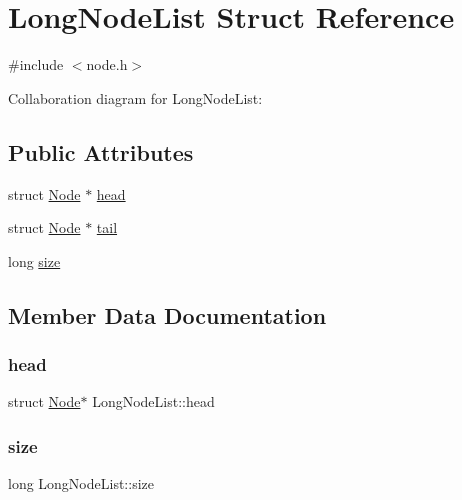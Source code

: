 \hypertarget{structLongNodeList}{}\section{Long\+Node\+List Struct Reference}
\label{structLongNodeList}


{\ttfamily \#include $<$node.\+h$>$}



Collaboration diagram for Long\+Node\+List\+:
\subsection*{Public Attributes}
\begin{DoxyCompactItemize}
\item 
struct \hyperlink{structNode}{Node} $\ast$ \hyperlink{structLongNodeList_a31ec5934364e5823abb697fe8678c03f}{head}
\item 
struct \hyperlink{structNode}{Node} $\ast$ \hyperlink{structLongNodeList_ad3e14e3494a357a5973eeae262c932b9}{tail}
\item 
long \hyperlink{structLongNodeList_a3d46bdf32e624d0b803a851d85695536}{size}
\end{DoxyCompactItemize}


\subsection{Member Data Documentation}
\mbox{\label{structLongNodeList_a31ec5934364e5823abb697fe8678c03f}} 
\subsubsection{\texorpdfstring{head}{head}}
{\footnotesize\ttfamily struct \hyperlink{structNode}{Node}$\ast$ Long\+Node\+List\+::head}

\mbox{\label{structLongNodeList_a3d46bdf32e624d0b803a851d85695536}} 
\subsubsection{\texorpdfstring{size}{size}}
{\footnotesize\ttfamily long Long\+Node\+List\+::size}

